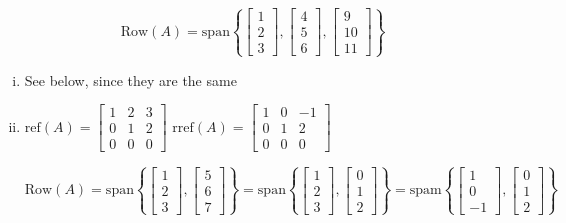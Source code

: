 \begin{sol}
	\[\mathrm{Row}(A) = \mathrm{span}\left\{\begin{bmatrix}
		1\\2\\3
	\end{bmatrix}, \begin{bmatrix}
		4\\5\\6
	\end{bmatrix}, \begin{bmatrix}
		9\\10\\11
	\end{bmatrix}\right\}\]

	\begin{enumerate}[i)]
		\item See below, since they are the same
		\item $\mathrm{ref}(A) = \begin{bmatrix}
			1&2&3\\
			0&1&2\\
			0&0&0
		\end{bmatrix}$
		$\mathrm{rref}(A) = \begin{bmatrix}
			1&0&-1\\
			0&1&2\\
			0&0&0
		\end{bmatrix}$

		\[\mathrm{Row}(A) = \mathrm{span}\left\{
			\begin{bmatrix}
				1\\2\\3
			\end{bmatrix}, \begin{bmatrix}
				5\\6\\7
			\end{bmatrix}
		\right\} = \mathrm{span}\left\{
			\begin{bmatrix}
				1\\2\\3
			\end{bmatrix}, \begin{bmatrix}
				0\\1\\2
			\end{bmatrix}
		\right\} = \mathrm{spam}\left\{
			\begin{bmatrix}
				1\\0\\-1
			\end{bmatrix}, \begin{bmatrix}
				0\\1\\2
			\end{bmatrix}
		\right\}\]


\end{enumerate}
\end{sol}
